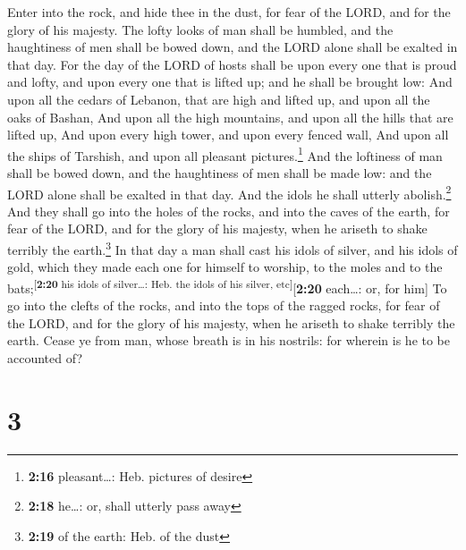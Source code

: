  Enter into the rock, and hide thee in the dust, for fear
of the LORD, and for the glory of his majesty.  The lofty
looks of man shall be humbled, and the haughtiness of men shall be bowed
down, and the LORD alone shall be exalted in that day. 
For the day of the LORD of hosts shall be upon every one that is proud
and lofty, and upon every one that is lifted up; and he shall be brought
low:  And upon all the cedars of Lebanon, that are high
and lifted up, and upon all the oaks of Bashan,  And upon
all the high mountains, and upon all the hills that are lifted up,
 And upon every high tower, and upon every fenced wall,
 And upon all the ships of Tarshish, and upon all
pleasant pictures.\footnote{\textbf{2:16} pleasant\ldots: Heb. pictures
  of desire}  And the loftiness of man shall be bowed
down, and the haughtiness of men shall be made low: and the LORD alone
shall be exalted in that day.  And the idols he shall
utterly abolish.\footnote{\textbf{2:18} he\ldots: or, shall utterly pass
  away}  And they shall go into the holes of the rocks,
and into the caves of the earth, for fear of the LORD, and for the glory
of his majesty, when he ariseth to shake terribly the earth.\footnote{\textbf{2:19}
  of the earth: Heb. of the dust}  In that day a man
shall cast his idols of silver, and his idols of gold, which they made
each one for himself to worship, to the moles and to the
bats;\textsuperscript{{[}\textbf{2:20} his idols of silver\ldots: Heb.
the idols of his silver, etc{]}}{[}\textbf{2:20} each\ldots: or, for
him{]}  To go into the clefts of the rocks, and into the
tops of the ragged rocks, for fear of the LORD, and for the glory of his
majesty, when he ariseth to shake terribly the earth. 
Cease ye from man, whose breath is in his nostrils: for wherein is he to
be accounted of?

\hypertarget{section-2}{%
\section{3}\label{section-2}}

